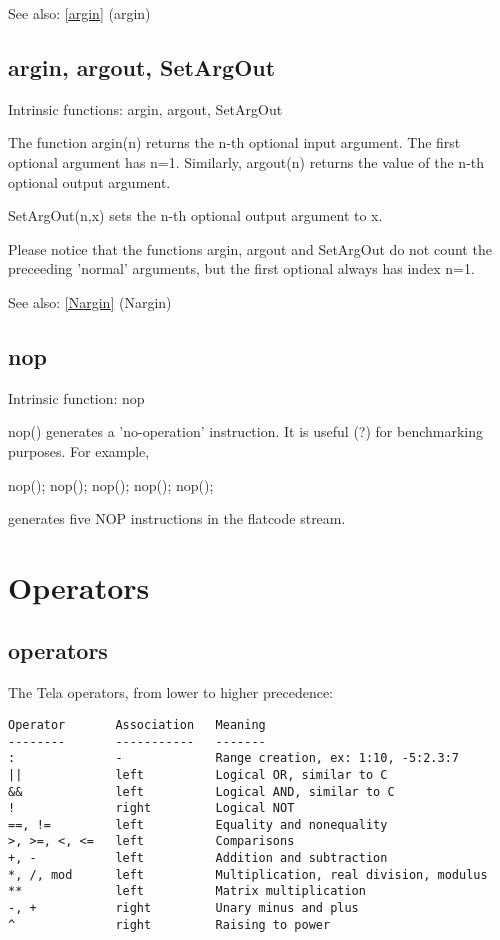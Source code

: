 \documentclass[a4paper]{article}
\begin{document}
See also: \ref{argin} {(argin)}




\subsection{argin, argout, SetArgOut\label{argin}}

Intrinsic functions: argin, argout, SetArgOut

The function argin(n) returns the n-th optional input argument. The
first optional argument has n=1. Similarly, argout(n) returns the
value of the n-th optional output argument.

SetArgOut(n,x) sets the n-th optional output argument to x.

Please notice that the functions argin, argout and SetArgOut do not
count the preceeding 'normal' arguments, but the first optional always
has index n=1.

See also: \ref{Nargin} {(Nargin)}




\subsection{nop\label{nop}}

Intrinsic function: nop

nop() generates a 'no-operation' instruction. It is useful (?) for
benchmarking purposes. For example,

nop(); nop(); nop(); nop(); nop();

generates five NOP instructions in the flatcode stream.




\section{Operators}


\subsection{operators\label{operators}}

The Tela operators, from lower to higher precedence:

\begin{tscreen}
\begin{verbatim}
Operator       Association   Meaning
--------       -----------   -------
:              -             Range creation, ex: 1:10, -5:2.3:7
||             left          Logical OR, similar to C
&&             left          Logical AND, similar to C
!              right         Logical NOT
==, !=         left          Equality and nonequality
>, >=, <, <=   left          Comparisons
+, -           left          Addition and subtraction
*, /, mod      left          Multiplication, real division, modulus
**             left          Matrix multiplication
-, +           right         Unary minus and plus
^              right         Raising to power
\end{verbatim}
\end{tscreen}
\end{document}
